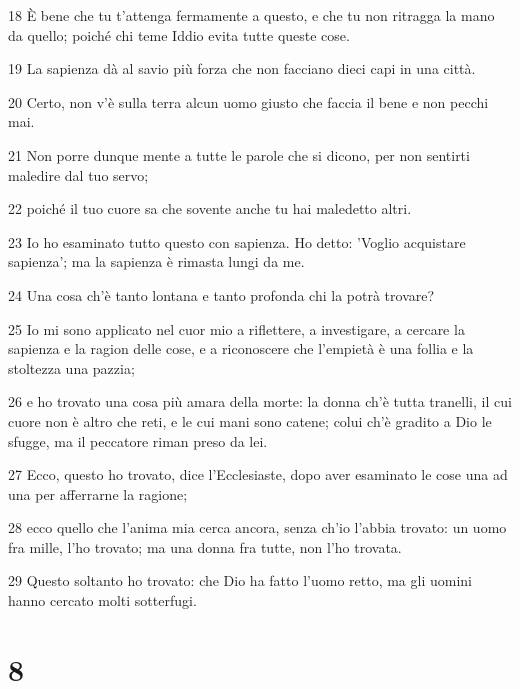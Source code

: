 \par 18 È bene che tu t'attenga fermamente a questo, e che tu non ritragga la mano da quello; poiché chi teme Iddio evita tutte queste cose.
\par 19 La sapienza dà al savio più forza che non facciano dieci capi in una città.
\par 20 Certo, non v'è sulla terra alcun uomo giusto che faccia il bene e non pecchi mai.
\par 21 Non porre dunque mente a tutte le parole che si dicono, per non sentirti maledire dal tuo servo;
\par 22 poiché il tuo cuore sa che sovente anche tu hai maledetto altri.
\par 23 Io ho esaminato tutto questo con sapienza. Ho detto: 'Voglio acquistare sapienza'; ma la sapienza è rimasta lungi da me.
\par 24 Una cosa ch'è tanto lontana e tanto profonda chi la potrà trovare?
\par 25 Io mi sono applicato nel cuor mio a riflettere, a investigare, a cercare la sapienza e la ragion delle cose, e a riconoscere che l'empietà è una follia e la stoltezza una pazzia;
\par 26 e ho trovato una cosa più amara della morte: la donna ch'è tutta tranelli, il cui cuore non è altro che reti, e le cui mani sono catene; colui ch'è gradito a Dio le sfugge, ma il peccatore riman preso da lei.
\par 27 Ecco, questo ho trovato, dice l'Ecclesiaste, dopo aver esaminato le cose una ad una per afferrarne la ragione;
\par 28 ecco quello che l'anima mia cerca ancora, senza ch'io l'abbia trovato: un uomo fra mille, l'ho trovato; ma una donna fra tutte, non l'ho trovata.
\par 29 Questo soltanto ho trovato: che Dio ha fatto l'uomo retto, ma gli uomini hanno cercato molti sotterfugi.

\chapter{8}

